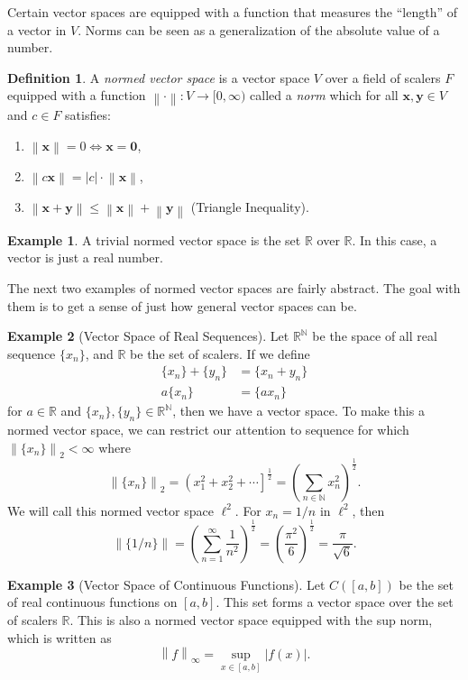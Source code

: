 \documentclass{article}
\newcommand{\N}{\mathbb{N}}
\newcommand{\R}{\mathbb{R}}
\newcommand{\x}{\mathbf{x}}
\newcommand{\y}{\mathbf{y}}
\newcommand{\ze}{\mathbf{0}}
\newcommand{\norm}[1]{\left\lVert#1\right\rVert}
\theoremstyle{definition}
\newtheorem{definition}{Definition}[section]
\newtheorem{example}{Example}[section]
\begin{document}
	Certain vector spaces are equipped with a function that measures the ``length'' of a vector in $ V $. Norms can be seen as a generalization of the absolute value of a number.
	\begin{definition}\label{def}
		A \textit{\color{red}normed vector space} is a vector space $ V $ over a field of scalers $ F $ equipped with a function $\norm{\cdot}:V\to[0,\infty)$ called a \textit{\color{red}norm} which for all $ \x,\y\in V $ and $ c\in F $ satisfies:
		\begin{enumerate}
			\item $ \norm{\x}=0\iff \x=\ze$,
			\item $ \norm{c\x}=|c|\cdot \norm{\x} $,
			\item $ \norm{\x+\y}\le\norm{\x}+\norm{\y} $ (Triangle Inequality).
		\end{enumerate} 
	\end{definition}
	\begin{example}
		A trivial normed vector space is the set $ \R $ over $ \R $. In this case, a vector is just a real number. 
	\end{example}
	The next two examples of normed vector spaces are fairly abstract. The goal with them is to get a sense of just how general vector spaces can be.
	\begin{example}[Vector Space of Real Sequences]
		Let $ \R^\N $ be the space of all real sequence $ \{x_n\} $, and $ \R $ be the set of scalers. If we define \begin{align*}
			\{x_n\}+\{y_n\}&=\{x_n+y_n\}\\
			a\{x_n\}&=\{ax_n \}
		\end{align*}
		for $ a\in\R $ and $ \{x_n\},\{y_n\}\in\R^\N $, then we have a vector space. To make this a normed vector space, we can restrict our attention to sequence for which $ \norm{\{x_n\}}_2<\infty $ where $$ \norm{\{x_n\}}_2=\left(x_1^2+x_2^2+\cdots\right]^\frac{1}{2}=\left(\sum_{n\in\N}x_n^2\right)^\frac{1}{2}.$$  We will call this normed vector space $ \ell^2 $. For $ x_n=1/n $ in $ \ell^2 $, then $$\norm{\{1/n\}}=\left(\sum_{n=1}^\infty\frac{1}{n^2}\right)^\frac{1}{2}=\left(\frac{\pi^2}{6}\right)^\frac{1}{2}=\frac{\pi}{\sqrt{6}} .$$ 
	\end{example}
	\begin{example}[Vector Space of Continuous Functions]
		Let $ C([a,b]) $ be the set of real continuous functions on $ [a,b] $. This set forms a vector space over the set of scalers $ \R $. This is also a normed vector space equipped with the sup norm, which is written as $$\norm{f}_\infty=\sup_{x\in [a,b]}|f(x)| .$$
	\end{example}
\end{document}
